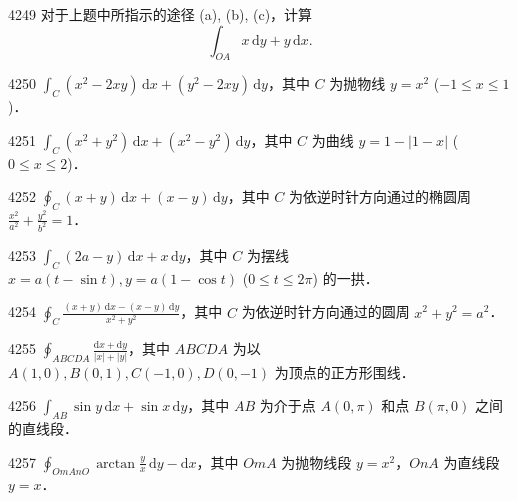 \begin{prob}[M]{4249}
对于上题中所指示的途径 (a), (b), (c)，计算
\[
\int_{OA} x\,\mathrm{d}y + y\,\mathrm{d}x.
\]
\end{prob}


\begin{prob}[S]{4250}
$\displaystyle\int_C (x^2-2xy)\,\mathrm{d}x + (y^2-2xy)\,\mathrm{d}y$，其中 $C$ 为抛物线 $y = x^2$ ($-1 \leqslant x \leqslant 1$)．
\end{prob}

\begin{prob}[S]{4251}
$\displaystyle\int_C (x^2+y^2)\,\mathrm{d}x + (x^2-y^2)\,\mathrm{d}y$，其中 $C$ 为曲线 $y = 1 - |1-x|$ ($0 \leqslant x \leqslant 2$)．
\end{prob}

\begin{prob}[S]{4252}
$\displaystyle\oint_C (x+y)\,\mathrm{d}x + (x-y)\,\mathrm{d}y$，其中 $C$ 为依逆时针方向通过的椭圆周 $\frac{x^2}{a^2} + \frac{y^2}{b^2} = 1$．
\end{prob}

\begin{prob}[S]{4253}
$\displaystyle\int_C (2a-y)\,\mathrm{d}x + x\,\mathrm{d}y$，其中 $C$ 为摆线 $x = a(t-\sin t), y = a(1-\cos t)$ ($0 \leqslant t \leqslant 2\pi$) 的一拱．
\end{prob}

\begin{prob}[S]{4254}
$\displaystyle\oint_C \frac{(x+y)\,\mathrm{d}x - (x-y)\,\mathrm{d}y}{x^2+y^2}$，其中 $C$ 为依逆时针方向通过的圆周 $x^2+y^2 = a^2$．
\end{prob}

\begin{prob}[M]{4255}
$\displaystyle\oint_{ABCDA} \frac{\mathrm{d}x + \mathrm{d}y}{|x| + |y|}$，其中 $ABCDA$ 为以 $A(1,0), B(0,1), C(-1,0), D(0,-1)$ 为顶点的正方形围线．
\end{prob}

\begin{prob}[S]{4256}
$\displaystyle\int_{AB} \sin y\,\mathrm{d}x + \sin x\,\mathrm{d}y$，其中 $AB$ 为介于点 $A(0,\pi)$ 和点 $B(\pi,0)$ 之间的直线段．
\end{prob}

\begin{prob}[M]{4257}
$\displaystyle\oint_{OmAnO} \arctan\frac{y}{x}\,\mathrm{d}y - \mathrm{d}x$，其中 $OmA$ 为抛物线段 $y = x^2$，$OnA$ 为直线段 $y = x$．
\end{prob}

